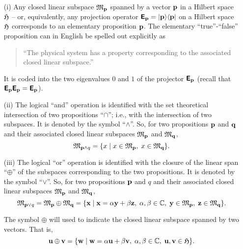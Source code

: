{\begin{itemize}

\item[(i)]
Any closed linear
subspace ${\mathfrak M}_{{\bf p}}$ spanned by a vector  ${{\bf p}}$ in a Hilbert space ${\frak H}$ -- or, equivalently, any
projection operator $\textsf{\textbf{E}}_{{\bf p}} =\vert {{\bf p}} \rangle \langle {{\bf p}}\vert$
 on  a Hilbert space ${\frak H}$ corresponds to an elementary
proposition ${{\bf p}}$. The elementary {``true''}-{``false''} proposition can in
English be spelled out explicitly as
\begin{quote}
``The physical system has a property corresponding to the associated closed linear subspace.''
\end{quote}
It is coded into the two eigenvalues $0$ and $1$ of  the projector $\textsf{\textbf{E}}_{{\bf p}}$
(recall that $\textsf{\textbf{E}}_{{\bf p}}\textsf{\textbf{E}}_{{\bf p}}=\textsf{\textbf{E}}_{{\bf p}}$).

\item[(ii)]
The logical {``and''} operation is identified with the set
theoretical intersection of two propositions ``$\cap$''; i.e., with the
intersection of two subspaces.
It is denoted by the symbol ``$\wedge$''.
So, for two
propositions ${{\bf p}}$ and ${{\bf q}}$ and their associated closed linear
subspaces
${\mathfrak M}_{{\bf p}}$ and
${\mathfrak M}_{{\bf q}}$,
$$
{\mathfrak M}_{{{\bf p}}\wedge q} = \{x \mid x\in
{\mathfrak M}_{{\bf p}}, \;
x\in {\mathfrak M}_{{\bf q}}\} .$$


\item[(iii)]
The logical {``or''} operation is identified with the closure of the
linear span ``$\oplus$'' of the subspaces corresponding to the two
propositions.
 It is denoted by the symbol ``$\vee$''.
So, for two
propositions ${{\bf p}}$ and $q$ and their associated closed linear
subspaces
${\mathfrak M}_{{\bf p}}$ and
${\mathfrak M}_{{\bf q}}$,
$$
{\mathfrak M}_{{{\bf p}}\vee q} =
{\mathfrak M}_{{{\bf p}}} \oplus
{\mathfrak M}_{{{\bf q}}} =
 \{{{\bf x}} \mid {{\bf x}}=\alpha {{\bf y}}+\beta {{\bf z}},\; \alpha,\beta \in {\mathbb C},\; {{\bf y}}\in
{\mathfrak M}_{{\bf p}}, \;
{{\bf z}}\in {\mathfrak M}_{{\bf q}}\} .$$



The symbol $\oplus$ will used to indicate the closed linear subspace
spanned by two vectors. That is,
$${{\bf u}}\oplus {{\bf v}}=\{ {{\bf w}}\mid {{\bf w}}=\alpha {{\bf u}}+ \beta {{\bf v}},\; \alpha,\beta \in {\mathbb C}
,\; {{\bf u}},{{\bf v}} \in {\mathfrak H}\}.$$



\end{itemize}}
